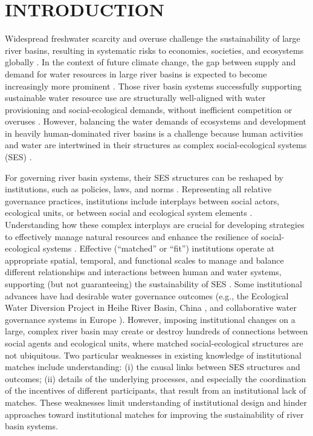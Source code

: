 \documentclass[default, sn-standardnature]{sn-jnl}
\begin{document}
\section{INTRODUCTION}\label{sec:introduction}
Widespread freshwater scarcity and overuse challenge the sustainability of large river basins, resulting in systematic risks to economies, societies, and ecosystems globally \cite{distefano2017, dolan2021, xu2020b, mekonnen2016}.
In the context of future climate change, the gap between supply and demand for water resources in large river basins is expected to become increasingly more prominent \cite{florke2018, yoon2021}.
Those river basin systems successfully supporting sustainable water resource use are structurally well-aligned with water provisioning and social-ecological demands, without inefficient competition or overuses \cite{wang2019d}.
However, balancing the water demands of ecosystems and development in heavily human-dominated river basins is a challenge because human activities and water are intertwined in their structures as complex social-ecological systems (SES) \cite{huggins2022,konar2019}.

For governing river basin systems, their SES structures can be reshaped by institutions, such as policies, laws, and norms \cite{young2008,cumming2020b}.
Representing all relative governance practices, institutions include interplays between social actors, ecological units, or between social and ecological system elements
\cite{lien2020, bodin2017b}.
Understanding how these complex interplays are crucial for developing strategies to effectively manage natural resources and enhance the resilience of social-ecological systems \cite{kluger2020}.
Effective (``matched'' or ``fit'') institutions operate at appropriate spatial, temporal, and functional scales to manage and balance different relationships and interactions between human and water systems, supporting (but not guaranteeing) the sustainability of SES \cite{epstein2015, wang2019d}.
Some institutional advances have had desirable water governance outcomes (e.g., the Ecological Water Diversion Project in Heihe River Basin, China \cite{wang2019d}, and collaborative water governance systems in Europe \cite{green2013}).
However, imposing institutional changes on a large, complex river basin may create or destroy hundreds of connections between social agents and ecological units, where matched social-ecological structures are not ubiquitous.
Two particular weaknesses in existing knowledge of institutional matches include understanding: (i) the causal links between SES structures and outcomes; (ii) details of the underlying processes, and especially the coordination of the incentives of different participants, that result from an institutional lack of matches.
These weaknesses limit understanding of institutional design and hinder approaches toward institutional matches for improving the sustainability of river basin systems.
\end{document}

